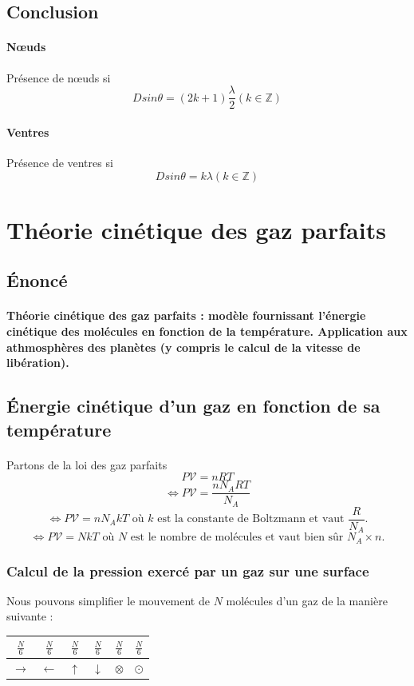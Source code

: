 \documentclass[a4paper]{article}
\begin{document}
\subsection{Conclusion}
\paragraph{Nœuds}Présence de nœuds si
\[Dsin\theta=(2k+1)\frac{\lambda}{2} (k \in \mathbb{Z})\]
\paragraph{Ventres}Présence de ventres si
\[Dsin\theta=k\lambda (k \in \mathbb{Z})\]
\section{Théorie cinétique des gaz parfaits}
\subsection{Énoncé}
\paragraph{}\textbf{Théorie cinétique des gaz parfaits : modèle fournissant l'énergie cinétique des molécules en fonction de la température. Application aux athmosphères des planètes (y compris le calcul de la vitesse de libération).}
\subsection{Énergie cinétique d'un gaz en fonction de sa température}
\paragraph{}Partons de la loi des gaz parfaits
\[P\mathscr{V}=nRT\]
\[\Leftrightarrow P\mathscr{V}=\frac{nN_ART}{N_A}\]
\[\Leftrightarrow P\mathscr{V}=nN_AkT \text{ où $k$ est la constante de Boltzmann et vaut $\frac{R}{N_A}$.}\]
\[\Leftrightarrow P\mathscr{V}=NkT \text{ où $N$ est le nombre de molécules et vaut bien sûr $N_A\times n$.}\]
\subsubsection{Calcul de la pression exercé par un gaz sur une surface}
Nous pouvons simplifier le mouvement de $N$ molécules d'un gaz de la manière suivante :
\begin{center}
\begin{tabular}{|c|c|c|c|c|c|}
\hline
$\frac{N}{6}$ & $\frac{N}{6}$ & $\frac{N}{6}$ & $\frac{N}{6}$ & $\frac{N}{6}$ & $\frac{N}{6}$ \\
\hline
$\rightarrow$ & $\leftarrow$ & $\uparrow$ & $\downarrow$ & $\otimes$ & $\odot$ \\
\hline
\end{tabular}
\end{center}
\end{document}
